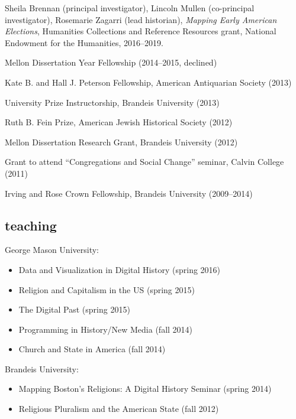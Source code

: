 \documentclass[11pt]{article}
\providecommand{\tightlist}{%
  \setlength{\itemsep}{0pt}\setlength{\parskip}{0pt}}
\begin{document}
Sheila Brennan (principal investigator), Lincoln Mullen (co-principal 
investigator), Rosemarie Zagarri (lead historian), \emph{Mapping Early 
  American Elections}, Humanities Collections and Reference Resources grant, 
National Endowment for the Humanities, 2016--2019.

Mellon Dissertation Year Fellowship (2014--2015, declined)

Kate B. and Hall J. Peterson Fellowship, American Antiquarian Society
(2013)

University Prize Instructorship, Brandeis University (2013)

Ruth B. Fein Prize, American Jewish Historical Society (2012)

Mellon Dissertation Research Grant, Brandeis University (2012)

Grant to attend ``Congregations and Social Change'' seminar, Calvin
College (2011)

Irving and Rose Crown Fellowship, Brandeis University (2009--2014)

\subsection{teaching}\label{teaching}

George Mason University:

\vspace{-0.2in}

\begin{itemize}
    \tightlist
  \item Data and Visualization in Digital History (spring 2016)
  \item Religion and Capitalism in the US (spring 2015) 
  \item The Digital Past (spring 2015)
  \item Programming in History/New Media (fall 2014) 
  \item Church and State in America (fall 2014)
\end{itemize}

\vspace{-0.1in}

Brandeis University:

\vspace{-0.2in}

\begin{itemize}
    \tightlist
  \item
    Mapping Boston's Religions: A Digital History Seminar (spring 2014)
  \item
    Religious Pluralism and the American State (fall 2012)
\end{itemize}
\end{document}

